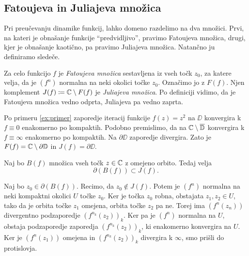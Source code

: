 
\subsection{Fatoujeva in Juliajeva množica}

Pri preučevanju dinamike funkcij, lahko domeno razdelimo na dva množici. Prvi, na kateri je obnašanje funkcije ``predvidljivo'', pravimo Fatoujeva množica, drugi, kjer je obnašanje kaotično, pa pravimo Juliajeva množica. Natančno ju definiramo sledeče.

Za celo funkcijo \(f\) je \emph{Fatoujeva množica} sestavljena iz vseh točk \(z_0\), za katere velja, da je \((f^n)\) normalna na neki okolici točke \(z_0\). Označimo jo z \(F (f)\). Njen komplement \(J (f) \coloneq \mathbb C \setminus F (f)\) je \emph{Juliajeva množica}. Po definiciji vidimo, da je Fatoujeva množica vedno odprta, Juliajeva pa vedno zaprta.

\begin{primer}
    Po primeru \ref{ex:primer} zaporedje iteracij funkcije \(f (z) = z^2\) na \(\DD\) konvergira k \(f \equiv 0\) enakomerno po kompaktih. Podobno premislimo, da na \(\mathbb C \setminus \overline{\mathbb D}\) konvergira k \(f \equiv \infty\) enakomerno po kompaktih. Na \(\partial \DD\) zaporedje divergira. Zato je \(F (f) = \mathbb C \setminus \partial \mathbb D\) in \(J (f) = \partial \DD\).
\end{primer}

\begin{izrek}
    Naj bo \(B (f)\) množica vseh točk \(z \in \mathbb C\) z omejeno orbito. Tedaj velja
    \[\partial (B (f)) \subset J (f).\]
\end{izrek}

\begin{dokaz}
    Naj bo \(z_0 \in \partial (B (f))\). Recimo, da \(z_0 \notin J (f)\). Potem je \((f^n)\) normalna na neki kompaktni okolici \(U\) točke \(z_0\). Ker je točka \(z_0\) robna, obstajata \(z_1, z_2 \in U\), tako da je orbita točke \(z_1\) omejena, orbita točke \(z_2\) pa ne. Torej ima \((f^n (z_n))\) divergentno podzaporedje \((f^{n_k} (z_2))_k\). Ker pa je \((f^n)\) normalna na \(U\), obstaja podzaporedje zaporedja \((f^{n_k} (z_2))_k\), ki enakomerno konvergira na \(U\). Ker je \((f^n (z_1))\) omejena in \((f^{n_k} (z_2))_k\) divergira k \(\infty\), smo prišli do protislovja.
\end{dokaz}

